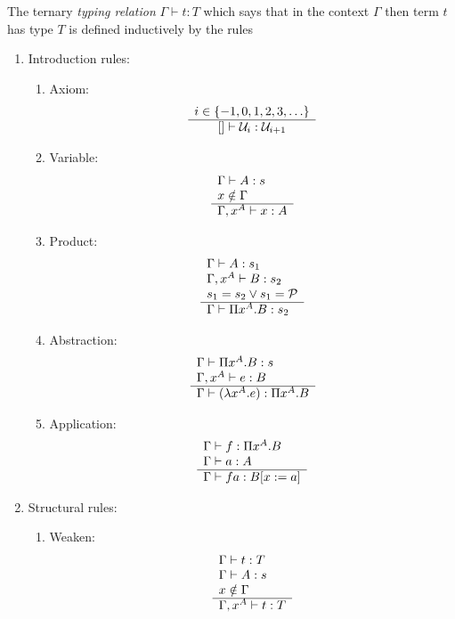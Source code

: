 \begin{definition}
    The ternary \emph{typing relation} $\Gamma \vdash t: T$ which says that in
    the context $\Gamma$ then term $t$ has type $T$ is defined inductively by
    the rules
    \begin{enumerate}
    \item Introduction rules:
        \begin{enumerate}
            \item Axiom:
                $$
                \begin{array}{c} i \in \{-1, 0, 1, 2, 3, \ldots \} \\ \hline  [] \vdash {\cal U}_i : {\cal U}_{i + 1}\end{array}
                $$

        \item Variable:
            $$
            \begin{array}{l} 
                \Gamma \vdash A: s
                \\
                x \notin \Gamma
             \\ \hline 
                \Gamma, x^A \vdash x: A
            \end{array}
            $$

        \item Product:
            $$
            \begin{array}{l} 
                \Gamma \vdash A: s_1
                \\
                \Gamma, x^A \vdash B: s_2
                \\
                s_1 = s_2 \lor s_1 = {\cal P}
             \\ \hline 
                \Gamma \vdash \Pi x^A.B : s_2
            \end{array}
            $$

        \item Abstraction:
            $$
            \begin{array}{l} 
                \Gamma \vdash \Pi x^A. B: s
                \\
                \Gamma, x^A \vdash e: B
             \\ \hline 
                \Gamma \vdash (\lambda x^A. e): \Pi x^A. B
            \end{array}
            $$

        \item Application:
            $$
            \begin{array}{l} 
                \Gamma \vdash f: \Pi x^A. B
                \\
                \Gamma \vdash a: A
             \\ \hline 
                \Gamma \vdash f a: B[x:=a]
            \end{array}
            $$
        \end{enumerate}


    \item Structural rules:
        \begin{enumerate}
        \item Weaken:
            $$
            \begin{array}{l} 
                \Gamma \vdash t: T
                \\
                \Gamma \vdash A: s
                \\
                x \notin \Gamma
             \\ \hline 
                \Gamma, x^A \vdash t: T
            \end{array}
            $$


\end{enumerate}
\end{enumerate}
\end{definition}
